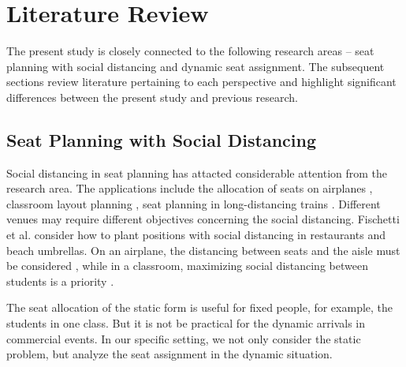 \section{Literature Review}

The present study is closely connected to the following research areas -- seat planning with social distancing and dynamic seat assignment. The subsequent sections review literature pertaining to each perspective and highlight significant differences between the present study and previous research.


\subsection{Seat Planning with Social Distancing}
Social distancing in seat planning has attacted considerable attention from the research area. The applications include the allocation of seats on airplanes \cite{ghorbani2020model}, classroom layout planning \cite{bortolete2022support}, seat planning in long-distancing trains \cite{haque2022optimization}.  Different venues may require different objectives concerning the social distancing. Fischetti et al.\cite{fischetti2021safe} consider how to plant positions with social distancing in restaurants and beach umbrellas. On an airplane, the distancing between seats and the aisle must be considered \cite{salari2022social}, while in a classroom, maximizing social distancing between students is a priority \cite{bortolete2022support}. 


The seat allocation of the static form is useful for fixed people, for example, the students in one class. But it is not be practical for the dynamic arrivals in commercial events. In our specific setting, we not only consider the static problem, but analyze the seat assignment in the dynamic situation.






